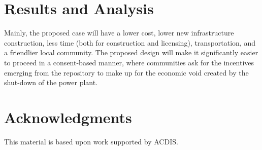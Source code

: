 \documentclass{anstrans}
\begin{document}



\section{Results and Analysis}



Mainly, the proposed case will have a lower cost, lower new infrastructure 
construction, less time (both for construction and licensing), transportation, 
and a friendlier local community. The proposed design will make it 
significantly easier to proceed in a consent-based manner, where communities 
ask for the incentives emerging from the repository to make up for the economic void created by the shut-down of the power plant. 


\section{Acknowledgments}

This material is based upon work supported by ACDIS.



\end{document}
